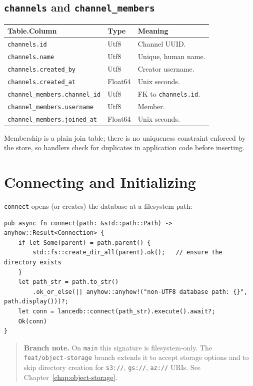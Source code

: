 \subsection*{\texttt{channels} and \texttt{channel\_members}}
\begin{center}
\begin{tabular}{@{}lll@{}}
\toprule
\textbf{Table.Column} & \textbf{Type} & \textbf{Meaning} \\
\midrule
\verb|channels.id| & Utf8 & Channel UUID. \\
\verb|channels.name| & Utf8 & Unique, human name. \\
\verb|channels.created_by| & Utf8 & Creator username. \\
\verb|channels.created_at| & Float64 & Unix seconds. \\
\verb|channel_members.channel_id| & Utf8 & FK to \verb|channels.id|. \\
\verb|channel_members.username| & Utf8 & Member. \\
\verb|channel_members.joined_at| & Float64 & Unix seconds. \\
\bottomrule
\end{tabular}
\end{center}
Membership is a plain join table; there is no uniqueness constraint enforced by
the store, so handlers check for duplicates in application code before inserting.

\section{Connecting and Initializing}

\verb|connect| opens (or creates) the database at a filesystem path:

\begin{lstlisting}
pub async fn connect(path: &std::path::Path) -> anyhow::Result<Connection> {
    if let Some(parent) = path.parent() {
        std::fs::create_dir_all(parent).ok();   // ensure the directory exists
    }
    let path_str = path.to_str()
        .ok_or_else(|| anyhow::anyhow!("non-UTF8 database path: {}", path.display()))?;
    let conn = lancedb::connect(path_str).execute().await?;
    Ok(conn)
}
\end{lstlisting}

\begin{quote}
\textbf{Branch note.} On \verb|main| this signature is filesystem-only. The
\verb|feat/object-storage| branch extends it to accept storage options and to
skip directory creation for \verb|s3://|, \verb|gs://|, \verb|az://| URIs.
See Chapter~\ref{chap:object-storage}.
\end{quote}

